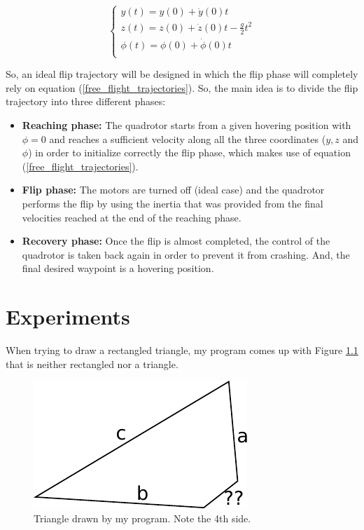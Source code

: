\documentclass{thesisreport}
\begin{document}
\begin{equation}\label{free_flight_trajectories}
 \begin{cases} 
       y(t) = y(0) + \dot{y}(0)t \\
       z(t) = z(0) +\dot{z}(0)t - \frac{g}{2}t^2  \\
       \phi(t) = \phi(0) + \dot{\phi}(0)t \\
   \end{cases}
\end{equation}

So, an ideal flip trajectory will be designed in which the flip phase will completely rely on equation (\ref{free_flight_trajectories}). So, the main idea is to divide the flip trajectory into three different phases: 

\begin{itemize}
	\item [] \textbf{Reaching phase:} The quadrotor starts from a given hovering position with $\phi=0$ and reaches a sufficient velocity along all the three coordinates ($y,z$ and $\phi$) in order to initialize correctly the flip phase, which makes use of equation (\ref{free_flight_trajectories}).
	\item [] \textbf{Flip phase: } The motors are turned off (ideal case) and the quadrotor performs the flip by using the inertia that was provided from the final velocities reached at the end of the reaching phase.
	\item [] \textbf{Recovery phase: } Once the flip is almost completed, the control of the quadrotor is taken back again in order to prevent it from crashing. And, the final desired waypoint is a hovering position.  
\end{itemize}















\newpage

  \chapter{Experiments}
 
 When trying to draw a rectangled triangle, my program comes up with Figure \ref{triangle2} that is neither rectangled nor a triangle.
 
  \begin{figure}[h]\centering
  \includegraphics[width=.5\linewidth]{triangle2}
  \caption{Triangle drawn by my program. Note the 4th side.} \label{triangle2}
 \end{figure}
 
\end{document}
